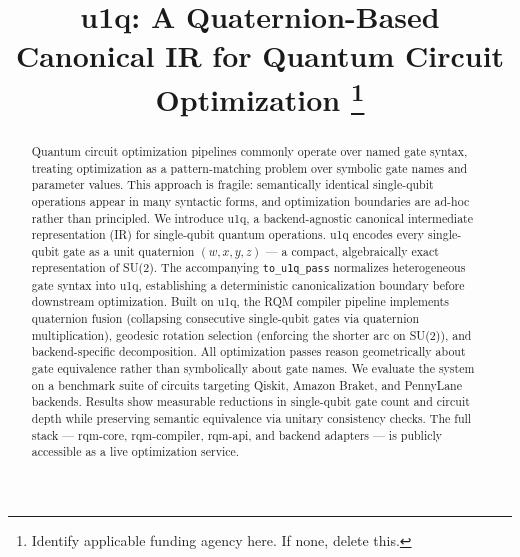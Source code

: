 \documentclass[conference]{IEEEtran}
\begin{document}
\title{u1q: A Quaternion-Based Canonical IR for Quantum Circuit Optimization%
\thanks{Identify applicable funding agency here. If none, delete this.}
}

\author{
\and
{}
}

\maketitle

\begin{abstract}
Quantum circuit optimization pipelines commonly operate over named gate syntax, treating
optimization as a pattern-matching problem over symbolic gate names and parameter values.
This approach is fragile: semantically identical single-qubit operations appear in many
syntactic forms, and optimization boundaries are ad-hoc rather than principled. We introduce
u1q, a backend-agnostic canonical intermediate representation (IR) for single-qubit quantum
operations. u1q encodes every single-qubit gate as a unit quaternion $(w, x, y, z)$ --- a
compact, algebraically exact representation of SU(2). The accompanying \texttt{to\_u1q\_pass}
normalizes heterogeneous gate syntax into u1q, establishing a deterministic canonicalization
boundary before downstream optimization. Built on u1q, the RQM compiler pipeline implements
quaternion fusion (collapsing consecutive single-qubit gates via quaternion multiplication),
geodesic rotation selection (enforcing the shorter arc on SU(2)), and backend-specific
decomposition. All optimization passes reason geometrically about gate equivalence rather than
symbolically about gate names. We evaluate the system on a benchmark suite of circuits
targeting Qiskit, Amazon Braket, and PennyLane backends. Results show measurable reductions in
single-qubit gate count and circuit depth while preserving semantic equivalence via unitary
consistency checks. The full stack --- rqm-core, rqm-compiler, rqm-api, and backend adapters
--- is publicly accessible as a live optimization service.
\end{abstract}
\end{document}

